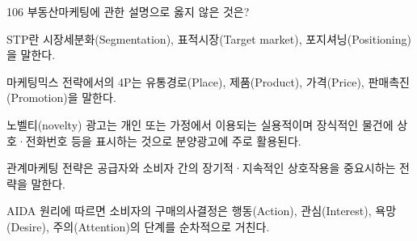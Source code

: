 \begin{question}{106}
부동산마케팅에 관한 설명으로 옳지 않은 것은?
\begin{choices}
  \item STP란 시장세분화(Segmentation), 표적시장(Target market), 포지셔닝(Positioning)을 말한다.
  \item 마케팅믹스 전략에서의 4P는 유통경로(Place), 제품(Product), 가격(Price), 판매촉진(Promotion)을 말한다.
  \item 노벨티(novelty) 광고는 개인 또는 가정에서 이용되는 실용적이며 장식적인 물건에 상호·전화번호 등을 표시하는 것으로 분양광고에 주로 활용된다.
  \item 관계마케팅 전략은 공급자와 소비자 간의 장기적·지속적인 상호작용을 중요시하는 전략을 말한다.
  \item AIDA 원리에 따르면 소비자의 구매의사결정은 행동(Action), 관심(Interest), 욕망(Desire), 주의(Attention)의 단계를 순차적으로 거친다.
\end{choices}
\end{question}
